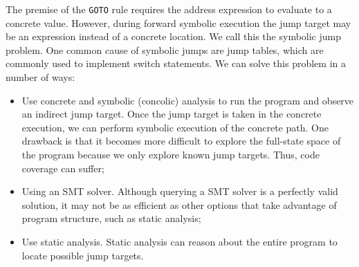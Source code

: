The premise of the \texttt{GOTO} rule requires the address expression to evaluate to a concrete value. However, during forward symbolic execution the jump target may be an expression instead of a concrete location. We call this the symbolic jump problem. One common cause of symbolic jumps are jump tables, which are commonly used to implement switch statements. We can solve this problem in a number of ways:
\begin{itemize}
	\item Use concrete and symbolic (concolic) analysis	to run the program and observe an indirect jump target. Once the jump target is taken in the concrete	execution, we can perform symbolic execution of the	concrete path. One drawback is that it becomes more difficult to explore the full-state space of the program because we only explore known jump targets. Thus, code coverage can suffer;
	\item Using an SMT solver. Although querying a SMT solver is a perfectly valid solution, it may not be as efficient as other options that take advantage of program structure, such as static analysis;
	\item Use static analysis. Static analysis can reason about the entire program to locate possible jump targets.
\end{itemize}